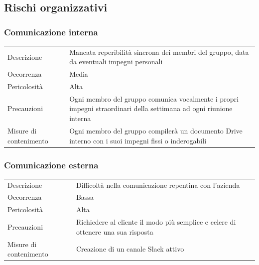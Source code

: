 \documentclass{article}
\begin{document}
\subsection{Rischi organizzativi}
\subsubsection{Comunicazione interna}
\begin{center}
\begin{tabular}{P{10em} P{20em}} 
     Descrizione & Mancata reperibilità sincrona dei membri del gruppo, data da eventuali impegni personali\\ 
    Occorrenza & Media\\
    Pericolosità & Alta \\
    Precauzioni & Ogni membro del gruppo comunica vocalmente i propri impegni straordinari della settimana ad ogni riunione interna \\
    Misure di contenimento & Ogni membro del gruppo compilerà un documento Drive interno  con i suoi impegni fissi o inderogabili \\
\end{tabular}
\label{tab:cominterna}
\end{center}

\subsubsection{Comunicazione esterna}
\begin{center}
\begin{tabular}{P{10em} P{20em}} 
     Descrizione & Difficoltà nella comunicazione repentina con l'azienda\\ 
    Occorrenza & Bassa\\
    Pericolosità & Alta \\
    Precauzioni & Richiedere al cliente il modo più semplice e celere di ottenere una sua risposta \\
    Misure di contenimento & Creazione di un canale Slack attivo\\
\end{tabular}
\label{tab:comesterna}
\end{center}
\end{document}
